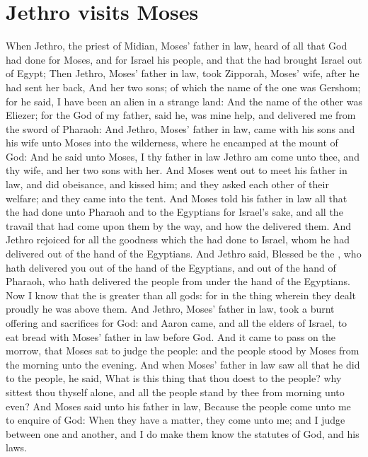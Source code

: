 \section*{Jethro visits Moses}
\begin{biblechapter} %
\verse When Jethro, the priest of Midian, Moses' father in law, heard of all that God had done for Moses, and for Israel his people, and that the \LORD had brought Israel out of Egypt;
\verse Then Jethro, Moses' father in law, took Zipporah, Moses' wife, after he had sent her back,
\verse And her two sons; of which the name of the one was Gershom; for he said, I have been an alien in a strange land:
\verse And the name of the other was Eliezer; for the God of my father, said he, was mine help, and delivered me from the sword of Pharaoh:
\verse And Jethro, Moses' father in law, came with his sons and his wife unto Moses into the wilderness, where he encamped at the mount of God:
\verse And he said unto Moses, I thy father in law Jethro am come unto thee, and thy wife, and her two sons with her.
\verse And Moses went out to meet his father in law, and did obeisance, and kissed him; and they asked each other of their welfare; and they came into the tent.
\verse And Moses told his father in law all that the \LORD had done unto Pharaoh and to the Egyptians for Israel's sake, and all the travail that had come upon them by the way, and how the \LORD delivered them.
\verse And Jethro rejoiced for all the goodness which the \LORD had done to Israel, whom he had delivered out of the hand of the Egyptians.
\verse And Jethro said, Blessed be the \LORD, who hath delivered you out of the hand of the Egyptians, and out of the hand of Pharaoh, who hath delivered the people from under the hand of the Egyptians.
\verse Now I know that the \LORD is greater than all gods: for in the thing wherein they dealt proudly he was above them.
\verse And Jethro, Moses' father in law, took a burnt offering and sacrifices for God: and Aaron came, and all the elders of Israel, to eat bread with Moses' father in law before God.
\verse And it came to pass on the morrow, that Moses sat to judge the people: and the people stood by Moses from the morning unto the evening.
\verse And when Moses' father in law saw all that he did to the people, he said, What is this thing that thou doest to the people? why sittest thou thyself alone, and all the people stand by thee from morning unto even?
\verse And Moses said unto his father in law, Because the people come unto me to enquire of God:
\verse When they have a matter, they come unto me; and I judge between one and another, and I do make them know the statutes of God, and his laws.

\end{biblechapter}
